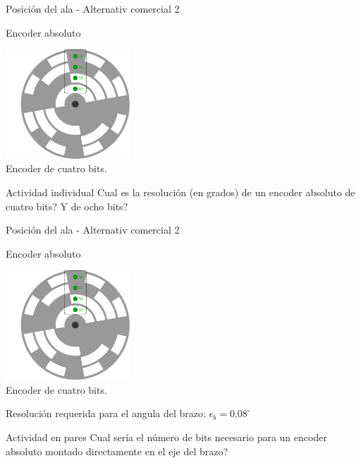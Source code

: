\documentclass[presentation,aspectratio=169]{beamer}
\begin{document}
\begin{frame}[label={sec:org2bdf013}]{Posición del ala - Alternativ comercial 2}
\begin{block}{Encoder absoluto}
\begin{center}
\includegraphics[width=0.35\textwidth]{../../figures/encoder-disc-absolute}\\
Encoder de cuatro bits.
\end{center}


\alert{Actividad individual} Cual es la resolución (en grados) de un encoder absoluto de cuatro bits? Y de ocho bits?
\end{block}
\end{frame}



\begin{frame}[label={sec:org0803bf4}]{Posición del ala - Alternativ comercial 2}
\begin{block}{Encoder absoluto}
\begin{center}
\includegraphics[width=0.35\textwidth]{../../figures/encoder-disc-absolute}\\
Encoder de cuatro bits.
\end{center}

Resolución requerida para el angula del brazo: \(\epsilon_b = 0.08^\circ\)


\alert{Actividad en pares} Cual sería el número de bits necesario para un encoder absoluto montado directamente en el eje del brazo?
\end{block}
\end{frame}
\end{document}

